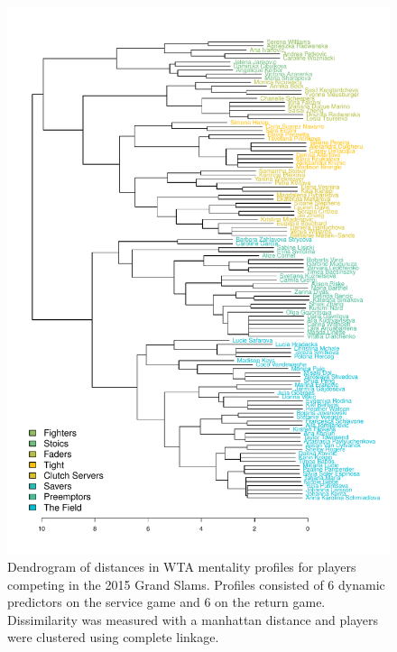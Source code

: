 \documentclass{Latex/svjour3}
\begin{document}
\begin{figure}
\includegraphics[scale=0.9]{figs/wta_dendro_std_fixed.pdf}
\caption{Dendrogram of distances in WTA mentality profiles for players competing
  in the 2015 Grand Slams. Profiles consisted of 6 dynamic predictors on the
  service game and 6 on the return game. Dissimilarity was measured with a
  manhattan distance and players were clustered using complete linkage.}
\label{fig:wta_dendro}
\end{figure}

\clearpage
\end{document}
